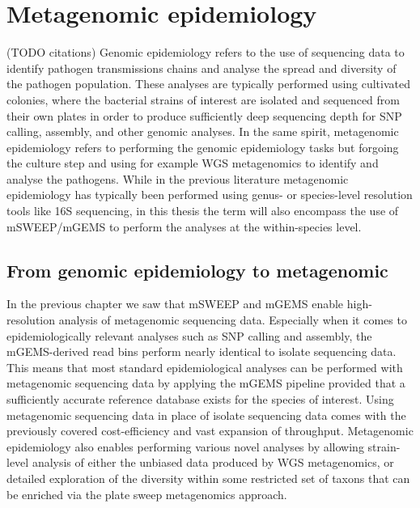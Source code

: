 \documentclass[officiallayout]{tktla}
\begin{document}

\chapter{Metagenomic epidemiology}
\label{section:metagenomic-epidemiology}

(TODO citations) Genomic epidemiology refers to the use of sequencing
data to identify pathogen transmissions chains and analyse the spread
and diversity of the pathogen population. These analyses are typically
performed using cultivated colonies, where the bacterial strains of
interest are isolated and sequenced from their own plates in order to
produce sufficiently deep sequencing depth for SNP calling, assembly,
and other genomic analyses. In the same spirit, metagenomic
epidemiology refers to performing the genomic epidemiology tasks but
forgoing the culture step and using for example WGS metagenomics to
identify and analyse the pathogens. While in the previous literature
metagenomic epidemiology has typically been performed using genus- or
species-level resolution tools like 16S sequencing, in this thesis the
term will also encompass the use of mSWEEP/mGEMS to perform the
analyses at the within-species level.

\section{From genomic epidemiology to metagenomic}

In the previous chapter we saw that mSWEEP and mGEMS enable
high-resolution analysis of metagenomic sequencing data. Especially
when it comes to epidemiologically relevant analyses such as SNP
calling and assembly, the mGEMS-derived read bins perform nearly
identical to isolate sequencing data. This means that most standard
epidemiological analyses can be performed with metagenomic sequencing
data by applying the mGEMS pipeline \textemdash{ } provided that a
sufficiently accurate reference database exists for the species of
interest. Using metagenomic sequencing data in place of isolate
sequencing data comes with the previously covered cost-efficiency and
vast expansion of throughput. Metagenomic epidemiology also enables
performing various novel analyses by allowing strain-level analysis of
either the unbiased data produced by WGS metagenomics, or detailed
exploration of the diversity within some restricted set of taxons that
can be enriched via the plate sweep metagenomics approach.
\end{document}
